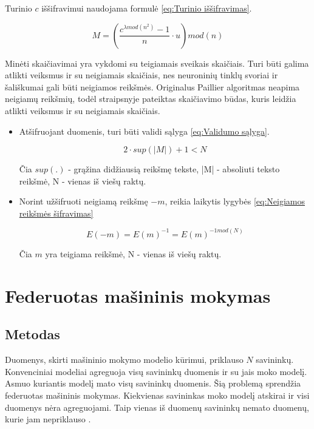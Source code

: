 \documentclass{VUMIFInfBakalaurinis}
\begin{document}
\par Turinio $c$ iššifravimui naudojama formulė \eqref{eq:Turinio iššifravimas}.

\begin{equation}
    M = (\frac{c^{\lambda mod (n^{2})} - 1}{n} \cdot u) mod (n)
    \label{eq:Turinio iššifravimas}
\end{equation}

\par Minėti skaičiavimai yra vykdomi su teigiamais sveikais skaičiais. Turi būti galima atlikti veiksmus ir su neigiamais skaičiais, nes neuroninių tinklų svoriai ir šališkumai gali būti neigiamos reikšmės. Originalus Paillier algoritmas neapima neigiamų reikšmių, todėl \cite{16} straipsnyje pateiktas skaičiavimo būdas, kuris leidžia atlikti veiksmus ir su neigiamais skaičiais.

\begin{itemize}
    \item Atšifruojant duomenis, turi būti validi sąlyga \eqref{eq:Validumo sąlyga}.
    
    \begin{equation}
        2 \cdot sup(|M|) + 1 < N
        \label{eq:Validumo sąlyga}
    \end{equation}

    Čia $sup(.)$ - grąžina didžiausią reikšmę tekste, |M| - absoliuti teksto reikšmė, N - vienas iš viešų raktų.
    \item Norint užšifruoti neigiamą reikšmę $-m$, reikia laikytis lygybės \eqref{eq:Neigiamos reikšmės šifravimas}
    
    \begin{equation}
        E(-m) = E(m)^{-1} = E(m)^{-1 mod(N)}
        \label{eq:Neigiamos reikšmės šifravimas}
    \end{equation}
    
    Čia $m$ yra teigiama reikšmė, N - vienas iš viešų raktų.
\end{itemize}

\section{Federuotas mašininis mokymas}
\subsection{Metodas}
\par Duomenys, skirti mašininio mokymo modelio kūrimui, priklauso $N$ savininkų. Konvenciniai modeliai agreguoja visų savininkų duomenis ir su jais moko modelį. Asmuo kuriantis modelį mato visų savininkų duomenis. Šią problemą sprendžia federuotas mašininis mokymas. Kiekvienas savininkas moko modelį atskirai ir visi duomenys nėra agreguojami. Taip vienas iš duomenų savininkų nemato duomenų, kurie jam nepriklauso \cite{18}.
\end{document}
